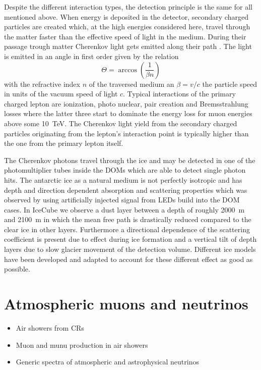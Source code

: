 
Despite the different interaction types, the detection principle is the same for all mentioned above.
When energy is deposited in the detector, secondary charged particles are created which, at the high energies considered here, travel through the matter faster than the effective speed of light in the medium.
During their passage trough matter Cherenkov light gets emitted along their path .
The light is emitted in an angle in first order given by the relation
\begin{equation}
  \Theta = \arccos\left(\frac{1}{\beta n}\right)
\end{equation}
with the refractive index $n$ of the traversed medium an $\beta = v/c$ the particle speed in units of the vacuum speed of light $c$.
Typical interactions of the primary charged lepton are ionization, photo nuclear, pair creation and Bremsstrahlung losses where the latter three start to dominate the energy loss for muon energies above some \SI{10}{\tera\eV}.
The Cherenkov light yield from the secondary charged particles originating from the lepton's interaction point is typically higher than the one from the primary lepton itself.

The Cherenkov photons travel through the ice and may be detected in one of the photomultiplier tubes inside the DOMs which are able to detect single photon hits.
The antarctic ice as a natural medium is not perfectly isotropic and has depth and direction dependent absorption and scattering properties which was observed by using artificially injected signal from LEDs build into the DOM cases.
In IceCube we observe a dust layer between a depth of roughly \SI{2000}{\m} and \SI{2100}{m} in which the mean free path is drastically reduced compared to the clear ice in other layers.
Furthermore a directional dependence of the scattering coefficient is present due to effect during ice formation and a vertical tilt of depth layers due to slow glacier movement of the detection volume.
Different ice models have been developed and adapted to account for these different effect as good as possible.

\section{Atmospheric muons and neutrinos}

\begin{itemize}
  \item Air showers from CRs
  \item Muon and munu production in air showers
  \item Generic spectra of atmospheric and astrophysical neutrinos
\end{itemize}